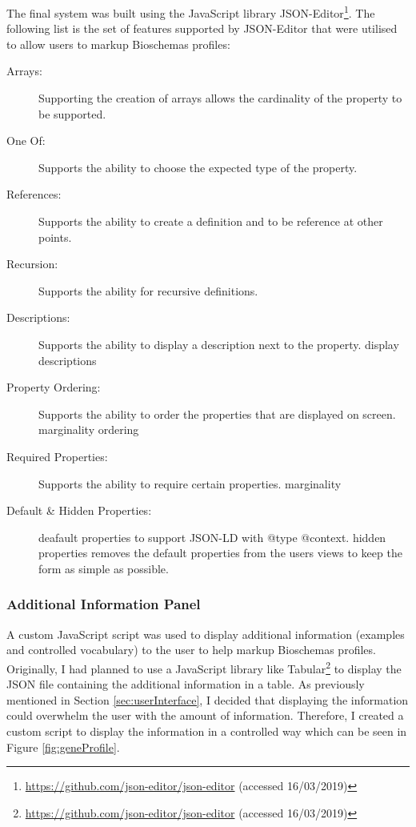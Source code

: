\newpage
The final system was built using the JavaScript library JSON-Editor\footnote{\url{https://github.com/json-editor/json-editor} (accessed 16/03/2019)}. The following list is the set of features supported by JSON-Editor that were utilised to allow users to markup Bioschemas profiles:

{
\begin{description}
  \item[Arrays: ]
  Supporting the creation of arrays allows the cardinality of the property to be supported. 
  \item[One Of: ]
  Supports the ability to choose the expected type of the property.
  \item[References: ] 
  Supports the ability to create a definition and to be reference at other points.
  \item[Recursion: ]
  Supports the ability for recursive definitions.
  \item[Descriptions: ]
  Supports the ability to display a description next to the property. display descriptions
  \item[Property Ordering: ]
  Supports the ability to order the properties that are displayed on screen.  marginality ordering
  \item[Required Properties: ]
  Supports the ability to require certain properties. marginality
  \item[Default \& Hidden Properties: ]
  deafault properties to support JSON-LD with @type @context.
  hidden properties removes the default properties from the users views to keep the form as simple as possible.
\end{description}
}

\subsubsection{Additional Information Panel} \label{sec:additionalinformation}
A custom JavaScript script was used to display additional information (examples and controlled vocabulary) to the user to help markup Bioschemas profiles. Originally, I had planned to use a JavaScript library like Tabular\footnote{\url{https://github.com/json-editor/json-editor} (accessed 16/03/2019)} to display the JSON file containing the additional information in a table. As previously mentioned in Section \ref{sec:userInterface}, I decided that displaying the information could overwhelm the user with the amount of information. Therefore, I created a custom script to display the information in a controlled way which can be seen in Figure \ref{fig:geneProfile}.

